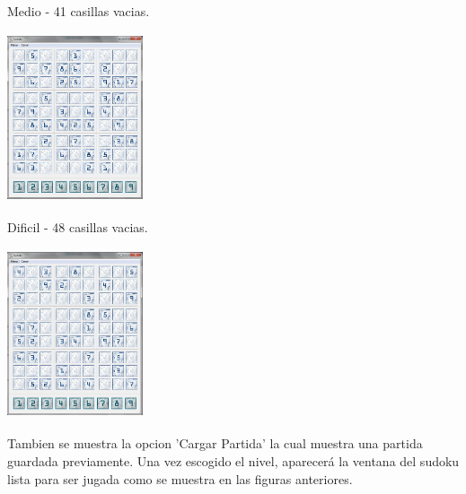 \documentclass[12pt]{article}
\begin{document}
		Medio - 41 casillas vacias.

		\begin{center}
			\includegraphics[height=5cm,width=4cm]{normal.jpg}
		\end{center}

		Dificil  - 48 casillas vacias.

		\begin{center}
			\includegraphics[height=5cm,width=4cm]{dificil.jpg}
		\end{center}

		Tambien se muestra la opcion 'Cargar Partida' la cual muestra una partida guardada previamente.	
		Una vez escogido el nivel, aparecerá la ventana del sudoku lista para ser jugada como se muestra en las figuras anteriores.

		
		
		



		
\end{document}
